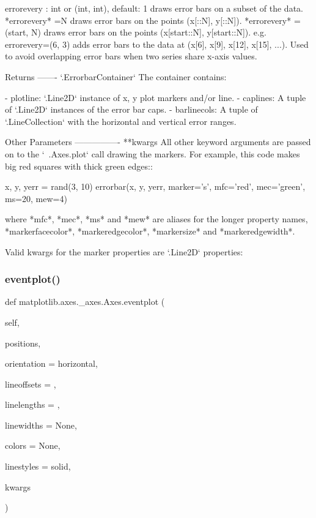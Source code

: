 \begin{DoxyVerb}
errorevery : int or (int, int), default: 1
    draws error bars on a subset of the data. *errorevery* =N draws
    error bars on the points (x[::N], y[::N]).
    *errorevery* =(start, N) draws error bars on the points
    (x[start::N], y[start::N]). e.g. errorevery=(6, 3)
    adds error bars to the data at (x[6], x[9], x[12], x[15], ...).
    Used to avoid overlapping error bars when two series share x-axis
    values.

Returns
-------
`.ErrorbarContainer`
    The container contains:

    - plotline: `.Line2D` instance of x, y plot markers and/or line.
    - caplines: A tuple of `.Line2D` instances of the error bar caps.
    - barlinecols: A tuple of `.LineCollection` with the horizontal and
      vertical error ranges.

Other Parameters
----------------
**kwargs
    All other keyword arguments are passed on to the `~.Axes.plot` call
    drawing the markers. For example, this code makes big red squares
    with thick green edges::

x, y, yerr = rand(3, 10)
errorbar(x, y, yerr, marker='s', mfc='red',
         mec='green', ms=20, mew=4)

    where *mfc*, *mec*, *ms* and *mew* are aliases for the longer
    property names, *markerfacecolor*, *markeredgecolor*, *markersize*
    and *markeredgewidth*.

    Valid kwargs for the marker properties are `.Line2D` properties:

\end{DoxyVerb}
 \mbox{\label{classmatplotlib_1_1axes_1_1__axes_1_1Axes_ad1e970c22ddd9f0fe2e2a4803274397d}} 
\subsubsection{\texorpdfstring{eventplot()}{eventplot()}}
{\footnotesize\ttfamily def matplotlib.\+axes.\+\_\+axes.\+Axes.\+eventplot (\begin{DoxyParamCaption}\item[{}]{self,  }\item[{}]{positions,  }\item[{}]{orientation = {\ttfamily \textquotesingle{}horizontal\textquotesingle{}},  }\item[{}]{lineoffsets = {},  }\item[{}]{linelengths = {},  }\item[{}]{linewidths = {\ttfamily None},  }\item[{}]{colors = {\ttfamily None},  }\item[{}]{linestyles = {\ttfamily \textquotesingle{}solid\textquotesingle{}},  }\item[{}]{kwargs }\end{DoxyParamCaption})}

